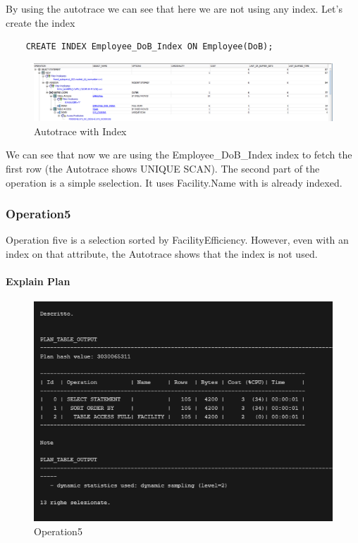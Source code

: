 By using the autotrace we can see that here we are not using any index. Let's create the index

\begin{lstlisting}
    CREATE INDEX Employee_DoB_Index ON Employee(DoB);
\end{lstlisting}

\begin{figure}[H]
    \centering
    \includegraphics[width=\textwidth]{images/OldManWithIndex.png}
    \caption{Autotrace with Index}
\end{figure}

We can see that now we are using the Employee\_DoB\_Index index to fetch the first row (the Autotrace shows UNIQUE SCAN). The second part of the operation is a simple sselection. It uses Facility.Name with is already indexed.

\subsubsection{Operation5}


Operation five is a selection sorted by FacilityEfficiency. However, even with an index on that attribute, the Autotrace shows that the index is not used.

\paragraph{Explain Plan} \leavevmode \newline

\begin{figure}[H]
    \centering
    \includegraphics[width=\textwidth]{images/ExPlan5.png}
    \caption{Operation5}
\end{figure}

